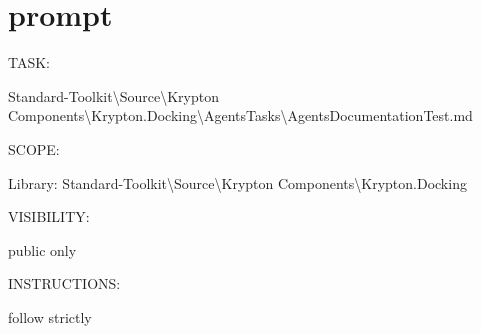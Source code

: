 \chapter{prompt }
\hypertarget{md__d_1_2_krypton_2_standard-_toolkit_2_source_2_krypton_01_components_2_krypton_8_docking_2_agents_tasks_2prompt}{}\label{md__d_1_2_krypton_2_standard-_toolkit_2_source_2_krypton_01_components_2_krypton_8_docking_2_agents_tasks_2prompt}
TASK\+:
\begin{DoxyItemize}
\item Standard-\/\+Toolkit\textbackslash{}\+Source\textbackslash{}\+Krypton Components\textbackslash{}\+Krypton.\+Docking\textbackslash{}\+Agents\+Tasks\textbackslash{}\+Agents\+Documentation\+Test.md
\end{DoxyItemize}

SCOPE\+:
\begin{DoxyItemize}
\item Library\+: Standard-\/\+Toolkit\textbackslash{}\+Source\textbackslash{}\+Krypton Components\textbackslash{}\+Krypton.\+Docking
\end{DoxyItemize}

VISIBILITY\+:
\begin{DoxyItemize}
\item public only
\end{DoxyItemize}

INSTRUCTIONS\+:
\begin{DoxyItemize}
\item follow  strictly 
\end{DoxyItemize}